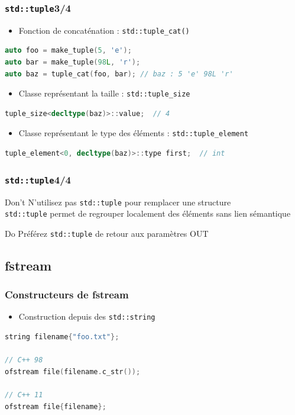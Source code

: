 \documentclass[C++.tex]{subfiles}
\begin{document}
\begin{frame}[fragile]
	\frametitle{\lstinline|std::tuple|\titlehfill{}3/4}
	\begin{itemize}
		\item Fonction de concaténation : \lstinline|std::tuple_cat()|
	\end{itemize}

	\begin{lstlisting}[language=C++]
auto foo = make_tuple(5, 'e');
auto bar = make_tuple(98L, 'r');
auto baz = tuple_cat(foo, bar); // baz : 5 'e' 98L 'r'\end{lstlisting}

	\begin{itemize}
		\item Classe représentant la taille : \lstinline|std::tuple_size|
	\end{itemize}

	\begin{lstlisting}[language=C++]
tuple_size<decltype(baz)>::value;  // 4\end{lstlisting}

	\begin{itemize}
		\item Classe représentant le type des éléments : \lstinline|std::tuple_element|
	\end{itemize}

	\begin{lstlisting}[language=C++]
tuple_element<0, decltype(baz)>::type first;  // int\end{lstlisting}
\end{frame}

\begin{frame}[fragile]
	\frametitle{\lstinline|std::tuple|\titlehfill{}4/4}
	\begin{alertblock}{Don't}
		N'utilisez pas \lstinline|std::tuple| pour remplacer une structure\\
		\lstinline|std::tuple| permet de regrouper localement des éléments sans lien sémantique
	\end{alertblock}

	\begin{exampleblock}{Do}
		Préférez \lstinline|std::tuple| de retour aux paramètres OUT
	\end{exampleblock}
\end{frame}

\subsection*{fstream}
\begin{frame}[fragile]
	\frametitle{Constructeurs de fstream}
	\begin{itemize}
		\item Construction depuis des \lstinline|std::string|
	\end{itemize}

	\begin{lstlisting}[language=C++]
string filename{"foo.txt"};

// C++ 98
ofstream file(filename.c_str());

// C++ 11
ofstream file{filename};\end{lstlisting}
\end{frame}
\end{document}
